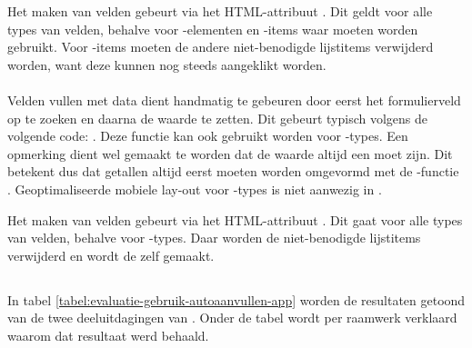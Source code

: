 Het  maken van velden gebeurt via het HTML-attribuut .
Dit geldt voor alle types van velden, behalve voor -elementen en -items waar  moeten worden gebruikt.
Voor -items moeten de andere niet-benodigde lijstitems verwijderd worden, want deze kunnen nog steeds aangeklikt worden.

\paragraph{\lungo}
Velden vullen met data dient handmatig te gebeuren door eerst het formulierveld op te zoeken en daarna de waarde te zetten.
Dit gebeurt typisch volgens de volgende code: .
Deze functie kan ook gebruikt worden voor -types.
Een opmerking dient wel gemaakt te worden dat de waarde altijd een  moet zijn.
Dit betekent dus dat getallen altijd eerst moeten worden omgevormd met de \js{}-functie . 
Geoptimaliseerde mobiele lay-out voor -types is niet aanwezig in \lungo.

Het  maken van velden gebeurt via het HTML-attribuut .
Dit gaat voor alle types van velden, behalve voor -types.
Daar worden de niet-benodigde lijstitems verwijderd en wordt de  zelf  gemaakt.


\subsection{}
\label{sec:evaluatie-gebruik-autoaanvullen-app}

In tabel \ref{tabel:evaluatie-gebruik-autoaanvullen-app} worden de resultaten getoond van de twee deeluitdagingen van .
Onder de tabel wordt per raamwerk verklaard waarom dat resultaat werd behaald.

\begin{table}[H]
\centering
{}
\caption{Gebruik van  voor \st{}~(\sta), \kendo{}~(\kendoa), \jqm{}~(\jqma) en \lungo{}~(\lungoa).}
\label{tabel:evaluatie-gebruik-autoaanvullen-app}
\end{table}

